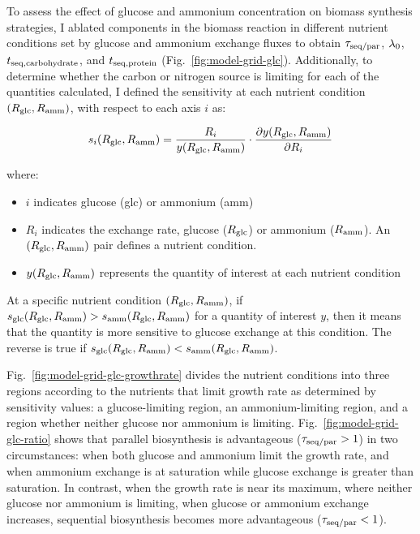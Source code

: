 To assess the effect of glucose and ammonium concentration on biomass synthesis strategies, I ablated components in the biomass reaction in different nutrient conditions set by glucose and ammonium exchange fluxes
to obtain $\tau_{\mathrm{seq}/\mathrm{par}}$, $\lambda_{0}$, $t_{\mathrm{seq},\mathrm{carbohydrate}}$, and $t_{\mathrm{seq},\mathrm{protein}}$ (Fig.\ \ref{fig:model-grid-glc}).
Additionally, to determine whether the carbon or nitrogen source is limiting for each of the quantities calculated, I defined the sensitivity at each nutrient condition $(R_{\mathrm{glc}}, R_{\mathrm{amm}})$, with respect to each axis $i$ as:

\begin{equation}
  s_{i}(R_{\mathrm{glc}}, R_{\mathrm{amm}}) = \frac{R_{i}}{y(R_{\mathrm{glc}}, R_{\mathrm{amm}})} \cdot \frac{\partial y(R_{\mathrm{glc}}, R_{\mathrm{amm}})}{\partial R_{i}}
  \label{eq:model-susceptibility}
\end{equation}

where:
\begin{itemize}
  \item $i$ indicates glucose (glc) or ammonium (amm)
  \item $R_{i}$ indicates the exchange rate, glucose ($R_{\mathrm{glc}}$) or ammonium ($R_{\mathrm{amm}}$).
        An $(R_{\mathrm{glc}}, R_{\mathrm{amm}})$ pair defines a nutrient condition.
  \item $y(R_{\mathrm{glc}}, R_{\mathrm{amm}})$ represents the quantity of interest at each nutrient condition
\end{itemize}

At a specific nutrient condition $(R_{\mathrm{glc}}, R_{\mathrm{amm}})$, if $s_{\mathrm{glc}}(R_{\mathrm{glc}}, R_{\mathrm{amm}}) > s_{\mathrm{amm}}(R_{\mathrm{glc}}, R_{\mathrm{amm}})$ for a quantity of interest $y$, then it means that the quantity is more sensitive to glucose exchange at this condition.
The reverse is true if $s_{\mathrm{glc}}(R_{\mathrm{glc}}, R_{\mathrm{amm}}) < s_{\mathrm{amm}}(R_{\mathrm{glc}}, R_{\mathrm{amm}})$.

Fig.\ \ref{fig:model-grid-glc-growthrate} divides the nutrient conditions into three regions according to the nutrients that limit growth rate as determined by sensitivity values: a glucose-limiting region, an ammonium-limiting region, and a region whether neither glucose nor ammonium is limiting.
Fig.\ \ref{fig:model-grid-glc-ratio} shows that parallel biosynthesis is advantageous ($\tau_{\mathrm{seq}/\mathrm{par}} > 1$) in two circumstances: when both glucose and ammonium limit the growth rate, and when ammonium exchange is at saturation while glucose exchange is greater than saturation.
In contrast, when the growth rate is near its maximum, where neither glucose nor ammonium is limiting, when glucose or ammonium exchange increases, sequential biosynthesis becomes more advantageous ($\tau_{\mathrm{seq}/\mathrm{par}} < 1$).

